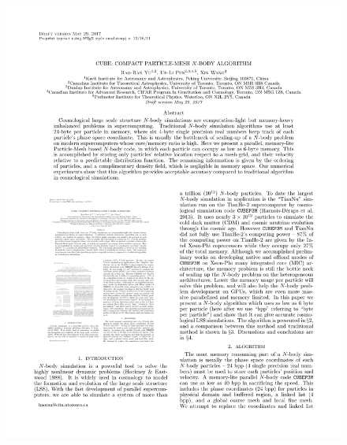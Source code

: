 \documentclass[10pt,twocolumn,preprint]{emulateapj}
\begin{document}
\begin{figure}[t]
\centering
  \includegraphics[width=0.95\linewidth]{ms_caf.pdf}
\end{figure}
\end{document}
